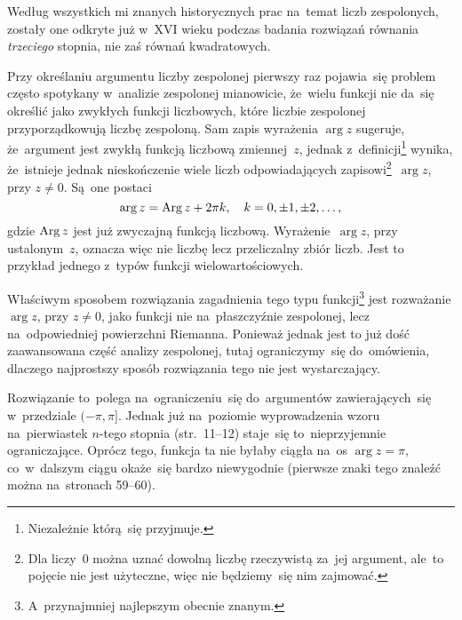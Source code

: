 \documentclass[a4paper,11pt]{article}
\begin{document}
\vspace{\spaceFour}





\noindent
{} Według wszystkich mi znanych historycznych prac na~temat liczb
zespolonych, zostały one odkryte już w~XVI wieku podczas badania rozwiązań
równania \textit{trzeciego} stopnia, nie zaś równań kwadratowych.

\vspace{\spaceFour}





\noindent
{} Przy określaniu argumentu liczby zespolonej pierwszy
raz pojawia~się problem często spotykany w~analizie zespolonej
mianowicie, że~wielu funkcji nie da~się określić jako zwykłych funkcji
liczbowych, które liczbie zespolonej przyporządkowują liczbę
zespoloną. Sam zapis wyrażenia $\arg z$ sugeruje, że~argument jest
zwykłą funkcją liczbową zmiennej~$z$, jednak
z~definicji\footnote{Niezależnie którą~się przyjmuje.} wynika,
że~istnieje jednak nieskończenie wiele liczb odpowiadających
zapisowi\footnote{Dla liczy~$0$ można uznać dowolną liczbę rzeczywistą
  za~jej argument, ale~to pojęcie nie jest użyteczne, więc nie
  będziemy~się nim zajmować.}~$\arg z$, przy $z \neq 0$. Są~one postaci
\begin{equation}
  \label{eq:Leja-Funkcje-zespolone-07}
  \arg z = \operatorname{Arg} z + 2\pi k, \quad k = 0, \pm 1, \pm 2, \ldots,
\end{equation}
gdzie $\operatorname{Arg} z$ jest już zwyczajną funkcją liczbową.
Wyrażenie~$\arg z$, przy ustalonym~$z$, oznacza więc nie liczbę lecz
przeliczalny zbiór liczb. Jest to przykład jednego z~typów funkcji
wielowartościowych.

Właściwym sposobem rozwiązania zagadnienia tego typu
funkcji\footnote{A~przynajmniej najlepszym obecnie znanym.} jest
rozważanie $\arg z$, przy $z \neq 0$, jako funkcji nie na~płaszczyźnie
zespolonej, lecz na~odpowiedniej powierzchni Riemanna. Ponieważ jednak
jest to już dość zaawansowana część analizy zespolonej, tutaj
ograniczymy~się do~omówienia, dlaczego najprostszy sposób rozwiązania
tego nie jest wystarczający.

Rozwiązanie to~polega na~ograniczeniu~się do~argumentów
zawierających~się w~przedziale $( -\pi, \pi ]$. Jednak już na~poziomie
wyprowadzenia wzoru na~pierwiastek $n$-tego stopnia (str.~11--12)
staje~się to~nieprzyjemnie ograniczające. Oprócz tego, funkcja ta nie
byłaby ciągła na~os $\arg z = \pi$, co~w~dalszym ciągu okaże~się
bardzo niewygodnie (pierwsze znaki tego znaleźć można na~stronach
59--60).
\end{document}
